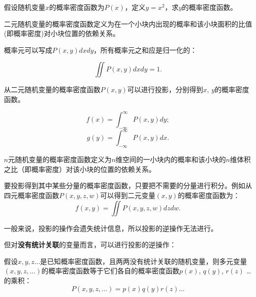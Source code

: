 \documentclass[CJK]{beamer}
\begin{document}
\begin{frame}
\bch


假设随机变量$x$的概率密度函数为$P(x)$，定义$y=x^2$，求$y$的概率密度函数。
\ech
\end{frame}

\begin{frame}
\bch

二元随机变量的概率密度函数定义为在一个小块内出现的概率和该小块面积的比值(即概率密度)对小块位置的依赖关系。


概率元可以写成$P(x,y) dx dy$，所有概率元之和应是归一化的：

$$\iint P(x,y) dx dy  = 1.$$

\ech
\end{frame}


\begin{frame}
\bch

从二元随机变量的概率密度函数$P(x,y)$可以进行投影，分别得到$x$, $y$的概率密度函数。


$$f(x) =  \int_{-\infty}^\infty P(x,y) dy;  $$
$$g(y) =  \int_{-\infty}^\infty P(x,y) dx.  $$

\ech
\end{frame}


\begin{frame}
\bch

$n$元随机变量的概率密度函数定义为$n$维空间的一小块内的概率和该小块的$n$维体积之比（即概率密度）对该小块的位置的依赖关系。

\skiplines

要投影得到其中某些分量的概率密度函数，只要把不需要的分量进行积分。例如从四元概率密度函数$P(x,y,z,w)$可以得到二元变量$(x,y)$的概率密度函数为：
$$ f(x,y) = \iint P(x,y,z,w) dz dw. $$


\ech
\end{frame}

\begin{frame}
\bch
一般来说，投影的操作会遗失统计信息，所以投影的逆操作无法进行。

但对{\bf 没有统计关联}的变量而言，可以进行投影的逆操作：


{\blue 假设$x,y,z\ldots$是已知概率密度函数，且两两没有统计关联的随机变量，则多元变量$(x, y,z,\ldots)$的概率密度函数等于它们各自的概率密度函数$p(x)$, $q(y)$, $r(z)$ \ldots 的乘积：
  $$P(x,y,z,\ldots) = p(x)q(y)r(z)\ldots $$
  }
\ech
\end{frame}
\end{document}

